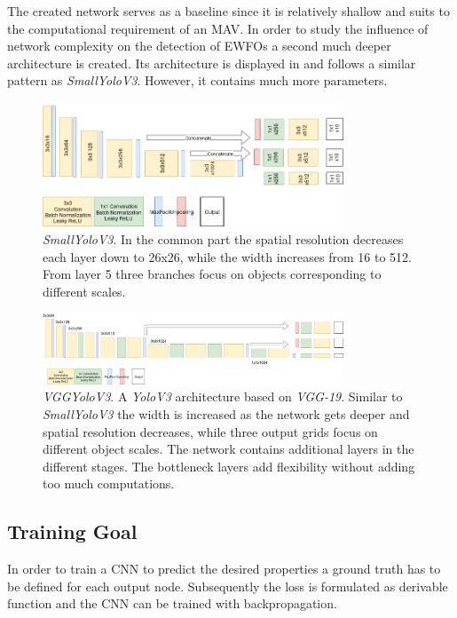 The created network serves as a baseline since it is relatively shallow and suits to the computational requirement of an \ac{MAV}. In order to study the influence of network complexity on the detection of \acp{EWFO} a second much deeper architecture is created. Its architecture is displayed in  and follows a similar pattern as \textit{SmallYoloV3}. However, it contains much more parameters.

\begin{figure}[hbtp]
	\centering
	\includegraphics[width=0.8\textwidth]{fig/SmallYoloV3}
	\caption{\textit{SmallYoloV3}. In the common part the spatial resolution decreases each layer down to 26x26, while the width increases from 16 to 512. From layer 5 three branches focus on objects corresponding to different scales. }
	\label{fig:tinyyolov3_arch}
\end{figure}

\begin{figure}[hbtp]
	\centering
	\includegraphics[width=0.8\textwidth]{fig/VGGYoloV3}
	\caption{\textit{VGGYoloV3}. A \textit{YoloV3} architecture based on \textit{VGG-19}. Similar to \textit{SmallYoloV3} the width is increased as the network gets deeper and spatial resolution decreases, while three output grids focus on different object scales. The network contains additional layers in the different stages. The bottleneck layers add flexibility without adding too much computations. }
	\label{fig:vggyolov3_arch}
\end{figure}

\subsection{Training Goal}

In order to train a \ac{CNN} to predict the desired properties a ground truth has to be defined for each output node. Subsequently the loss is formulated as derivable function and the \ac{CNN} can be trained with backpropagation.

